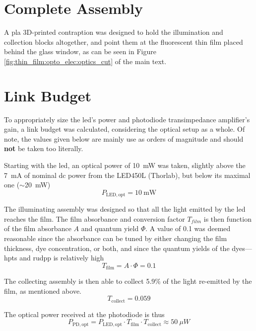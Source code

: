 \section{Complete Assembly}

A \gls{pla} 3D-printed contraption was designed to hold the illumination and collection blocks altogether, and point them at the fluorescent thin film placed behind the glass window, as can be seen in Figure \ref{fig:thin_film:opto_elec:optics_cut} of the main text.

\section{Link Budget}\label{ansect:optics:link_budget}

To appropriately size the \gls{led}'s power and photodiode transimpedance amplifier's gain, a link budget was calculated, considering the optical setup as a whole. Of note, the values given below are mainly use as orders of magnitude and should \textbf{not} be taken too literally.

Starting with the \gls{led}, an optical power of 10~mW was taken, slightly above the 7~mA of nominal \gls{dc} power from the LED450L (Thorlab), but below its maximal one ($\sim$20~mW)
\begin{equation}
	P_\mathrm{LED, opt} = 10~\mathrm{mW}
\end{equation}

The illuminating assembly was designed so that all the light emitted by the \gls{led} reaches the film. The film absorbance and conversion factor $T_{film}$ is then function of the film absorbance $A$ and quantum yield $\Phi$. A value of 0.1 was deemed reasonable since the absorbance can be tuned by either changing the film thickness, dye concentration, or both, and since the quantum yields of the dyes---\ie{} \gls{hpts} and \gls{rudpp} is relatively high
\begin{equation}
	T_\mathrm{film} = A \cdot \Phi = 0.1
\end{equation}

The collecting assembly is then able to collect 5.9\% of the light re-emitted by the film, as mentioned above.
\begin{equation}
	T_\mathrm{collect} = 0.059
\end{equation}

The optical power received at the photodiode is thus
\begin{equation}
	P_\mathrm{PD,opt} = P_\mathrm{LED,opt} \cdot T_\mathrm{film} \cdot T_\mathrm{collect} \approx 50~{\mu}W
\end{equation}

